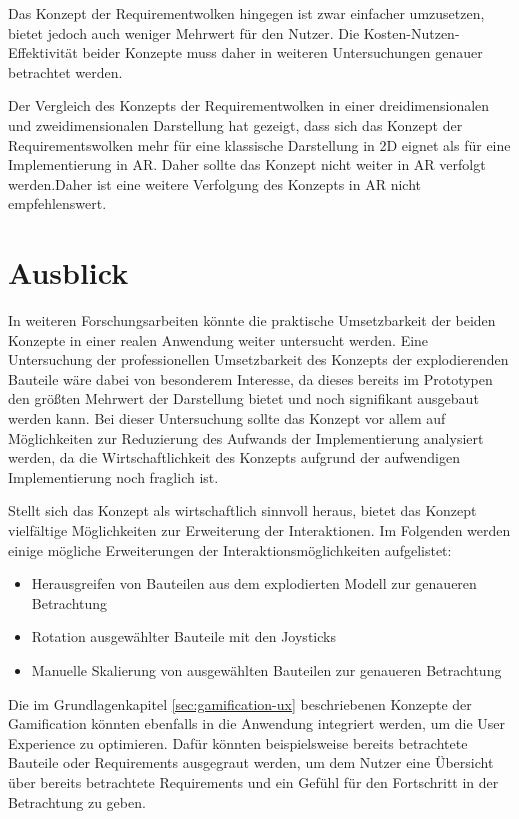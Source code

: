 Das Konzept der Requirementwolken hingegen ist zwar einfacher umzusetzen, bietet jedoch auch weniger Mehrwert für den Nutzer.
Die Kosten-Nutzen-Effektivität beider Konzepte muss daher in weiteren Untersuchungen genauer betrachtet werden.

Der Vergleich des Konzepts der Requirementwolken in einer dreidimensionalen und zweidimensionalen Darstellung hat gezeigt, dass sich das Konzept der Requirementswolken mehr für eine klassische Darstellung in 2D eignet als für eine Implementierung in AR.
Daher sollte das Konzept nicht weiter in AR verfolgt werden.Daher ist eine weitere Verfolgung des Konzepts in AR nicht empfehlenswert.

\newpage

\section{Ausblick}
\label{section:ausblick}

In weiteren Forschungsarbeiten könnte die praktische Umsetzbarkeit der beiden Konzepte in einer realen Anwendung weiter untersucht werden.
Eine Untersuchung der professionellen Umsetzbarkeit des Konzepts der explodierenden Bauteile wäre dabei von besonderem Interesse, da dieses bereits im Prototypen den größten Mehrwert der Darstellung bietet und noch signifikant ausgebaut werden kann.
Bei dieser Untersuchung sollte das Konzept vor allem auf Möglichkeiten zur Reduzierung des Aufwands der Implementierung analysiert werden, da die Wirtschaftlichkeit des Konzepts aufgrund der aufwendigen Implementierung noch fraglich ist.


Stellt sich das Konzept als wirtschaftlich sinnvoll heraus, bietet das Konzept vielfältige Möglichkeiten zur Erweiterung der Interaktionen.
Im Folgenden werden einige mögliche Erweiterungen der Interaktionsmöglichkeiten aufgelistet:
\begin{itemize}
    \item Herausgreifen von Bauteilen aus dem explodierten Modell zur genaueren Betrachtung
    \item Rotation ausgewählter Bauteile mit den Joysticks
    \item Manuelle Skalierung von ausgewählten Bauteilen zur genaueren Betrachtung
\end{itemize}

Die im Grundlagenkapitel \ref{sec:gamification-ux} beschriebenen Konzepte der Gamification könnten ebenfalls in die Anwendung integriert werden, um die User Experience zu optimieren.
Dafür könnten beispielsweise bereits betrachtete Bauteile oder Requirements ausgegraut werden, um dem Nutzer eine Übersicht über bereits betrachtete Requirements und ein Gefühl für den \glqq{}Fortschritt\grqq{} in der Betrachtung zu geben.

